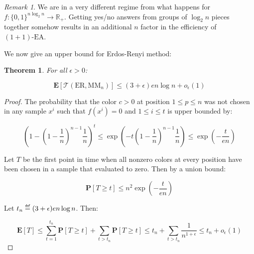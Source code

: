 \documentclass[12pt]{article}
\theoremstyle{definition}
\theoremstyle{plain}
\newtheorem*{theorem}{Theorem}
\theoremstyle{remark}
\newtheorem*{remark}{Remark}
\newcommand\mydef{\mathrel{\overset{\makebox[0pt]{\mbox{\normalfont\tiny\sffamily def}}}{=}}}
\begin{document}
\begin{remark}
    We are in a very different regime from what happens for $f:\{0,1\}^{n \log_2 n}\to \mathbb{R}_+$. Getting yes/no
    answers from groups of $\log_2 n$ pieces together somehow results in an additional $n$ factor in the efficiency of $(1+1)\text{-EA}$.
\end{remark}

We now give an upper bound for Erdos-Renyi method:

\begin{theorem}
    For all $\epsilon>0$:

    $$\mathbf{E}[\mathcal{T}(\text{ER}, \text{MM}_n)]\le (3+\epsilon) en\log n+o_\epsilon(1)$$
\end{theorem}

\begin{proof}
    The probability that the color $c>0$ at position $1\le p\le n$
    was not chosen in any sample $x^i$ such that $f(x^i)=0$ and $1\le i\le t$
    is upper bounded by:

    $$\left(1-\left(1-\frac{1}{n}\right)^{n-1}\frac{1}{n}\right)^t\le \exp\left(-t\left(1-\frac{1}{n}\right)^{n-1}\frac{1}{n}\right)\le\exp\left(-\frac{t}{en}\right)$$

    Let $T$ be the first point in time when all nonzero colors at every position have
    been chosen in a sample that evaluated to zero. Then by a union bound:

    $$\mathbf{P}[T\ge t]\le n^2 \exp\left(-\frac{t}{en}\right)$$

    Let $t_n\mydef (3+\epsilon)en\log n$. Then:

    $$\mathbf{E}[T]\le \sum_{t=1}^{t_n} \mathbf{P}[T\ge t] +\sum_{t>t_n} \mathbf{P}[T\ge t]\le t_n+\sum_{t>t_n} \frac{1}{n^{1+\epsilon}}\le t_n+o_{\epsilon}(1)$$
\end{proof}
\end{document}
